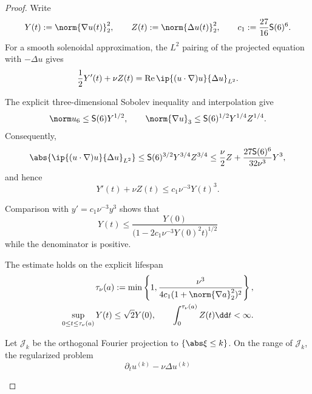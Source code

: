 \begin{proof}
Write
\[
 Y(t):=\norm{\nabla u(t)}_2^2,
 \qquad
 Z(t):=\norm{\Delta u(t)}_2^2,
 \qquad
 c_1:=\frac{27}{16}\mathsf S(6)^6.
\]
For a smooth solenoidal approximation, the \(L^2\) pairing of the projected
equation with \(-\Delta u\) gives
\begin{equation}
 \frac12Y'(t)+\nu Z(t)
 =\operatorname{Re}\ip{(u\cdot\nabla)u}{\Delta u}_{L^2}.
 \label{eq:qc-H1-energy-pairing}
\end{equation}
\begin{samepage}
The explicit three-dimensional Sobolev inequality and interpolation give
\[
 \norm u_6\le\mathsf S(6)Y^{1/2},
 \qquad
 \norm{\nabla u}_3
 \le\mathsf S(6)^{1/2}Y^{1/4}Z^{1/4}.
\]
Consequently,
\[
 \abs{\ip{(u\cdot\nabla)u}{\Delta u}_{L^2}}
 \le \mathsf S(6)^{3/2}Y^{3/4}Z^{3/4}
 \le\frac\nu2Z+\frac{27\mathsf S(6)^6}{32\nu^3}Y^3,
\]
and hence
\begin{equation}
 Y'(t)+\nu Z(t)\le c_1\nu^{-3}Y(t)^3.
 \label{eq:qc-H1-ode}
\end{equation}
\par
\end{samepage}
\begin{samepage}
Comparison with \(y'=c_1\nu^{-3}y^3\) shows that
\begin{equation}
 Y(t)\le
 \frac{Y(0)}{\bigl(1-2c_1\nu^{-3}Y(0)^2t\bigr)^{1/2}}
 \label{eq:qc-H1-local-explicit}
\end{equation}
while the denominator is positive.
\par
\end{samepage}
\begin{samepage}
The estimate holds on the explicit lifespan
\begin{equation}
 \begin{aligned}
 \tau_\nu(a):=
 \min\left\{1,
 \frac{\nu^3}{4c_1(1+\norm{\nabla a}_2^2)^2}
 \right\},\\
 \sup_{0\le t\le\tau_\nu(a)}Y(t)\le\sqrt2Y(0),
 \qquad
 \int_0^{\tau_\nu(a)}Z(t)\dd t<\infty.
 \end{aligned}
 \label{eq:qc-H1-local-lifespan}
\end{equation}
\par
\end{samepage}
\begin{samepage}
Let \(\mathcal J_k\) be the orthogonal Fourier projection to
\(\{\abs\xi\le k\}\).  On the range of \(\mathcal J_k\), the regularized
problem
\begin{equation}
 \partial_tu^{(k)}-\nu\Delta u^{(k)}

\end{equation}
\end{samepage}
\end{proof}
